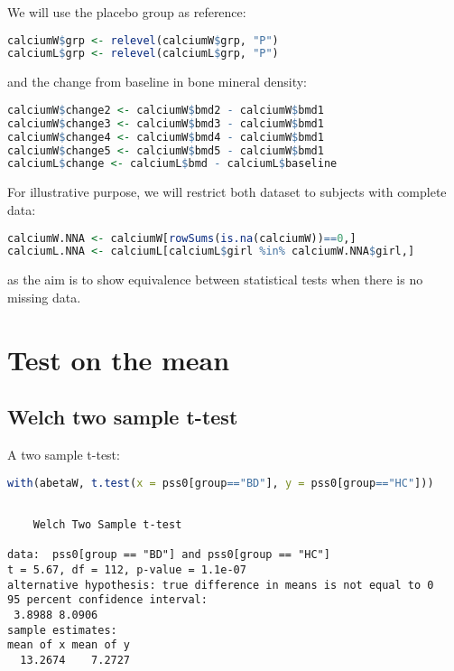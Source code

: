 \documentclass[12pt]{article}
\begin{document}
We will use the placebo group as reference:
\begin{lstlisting}[language=r,numbers=none]
calciumW$grp <- relevel(calciumW$grp, "P")
calciumL$grp <- relevel(calciumL$grp, "P")
\end{lstlisting}

and the change from baseline in bone mineral density:
\begin{lstlisting}[language=r,numbers=none]
calciumW$change2 <- calciumW$bmd2 - calciumW$bmd1
calciumW$change3 <- calciumW$bmd3 - calciumW$bmd1
calciumW$change4 <- calciumW$bmd4 - calciumW$bmd1
calciumW$change5 <- calciumW$bmd5 - calciumW$bmd1
calciumL$change <- calciumL$bmd - calciumL$baseline
\end{lstlisting}


For illustrative purpose, we will restrict both dataset to subjects
with complete data:
\begin{lstlisting}[language=r,numbers=none]
calciumW.NNA <- calciumW[rowSums(is.na(calciumW))==0,]
calciumL.NNA <- calciumL[calciumL$girl %in% calciumW.NNA$girl,]
\end{lstlisting}

as the aim is to show equivalence between statistical tests when there
is no missing data. 

\clearpage
\section{Test on the mean}
\label{sec:org60640c5}
\subsection{Welch two sample t-test}
\label{sec:orgaf19b93}

A two sample t-test:
\begin{lstlisting}[language=r,numbers=none]
with(abetaW, t.test(x = pss0[group=="BD"], y = pss0[group=="HC"]))
\end{lstlisting}

\label{}
\begin{verbatim}

	Welch Two Sample t-test

data:  pss0[group == "BD"] and pss0[group == "HC"]
t = 5.67, df = 112, p-value = 1.1e-07
alternative hypothesis: true difference in means is not equal to 0
95 percent confidence interval:
 3.8988 8.0906
sample estimates:
mean of x mean of y 
  13.2674    7.2727
\end{verbatim}
\end{document}
